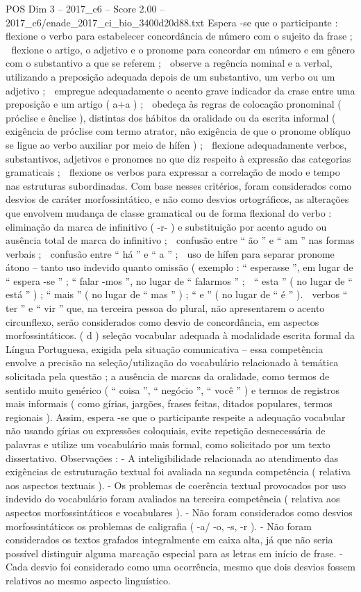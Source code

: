\begin{textsample}{POS Dim 3 – 2017\_c6 – Score 2.00 – 2017\_c6/enade\_2017\_ci\_bio\_3400d20d88.txt}
Espera -se que o participante :  flexione o verbo para estabelecer concordância de número com o sujeito da frase ;  flexione o artigo, o adjetivo e o pronome para concordar em número e em gênero com o substantivo a que se referem ;  observe a regência nominal e a verbal, utilizando a preposição adequada depois de um substantivo, um verbo ou um adjetivo ;  empregue adequadamente o acento grave indicador da crase entre uma preposição e um artigo ( a+a ) ;  obedeça às regras de colocação pronominal ( próclise e ênclise ), distintas dos hábitos da oralidade ou da escrita informal ( exigência de próclise com termo atrator, não exigência de que o pronome oblíquo se ligue ao verbo auxiliar por meio de hífen ) ;  flexione adequadamente verbos, substantivos, adjetivos e pronomes no que diz respeito à expressão das categorias gramaticais ;  flexione os verbos para expressar a correlação de modo e tempo nas estruturas subordinadas.
Com base nesses critérios, foram considerados como desvios de caráter morfossintático, e não como desvios ortográficos, as alterações que envolvem mudança de classe gramatical ou de forma flexional do verbo :  eliminação da marca de infinitivo ( -r- ) e substituição por acento agudo ou ausência total de marca do infinitivo ;  confusão entre “ ão ” e “ am ” nas formas verbais ;  confusão entre “ há ” e “ a ” ;  uso de hífen para separar pronome átono – tanto uso indevido quanto omissão ( exemplo : “ esperasse ”, em lugar de “ espera -se ” ; “ falar -mos ”, no lugar de “ falarmos ” ;  “ esta ” ( no lugar de “ está ” ) ; “ mais ” ( no lugar de “ mas ” ) ; “ e ” ( no lugar de “ é ” ).  verbos “ ter ” e “ vir ” que, na terceira pessoa do plural, não apresentarem o acento circunflexo, serão considerados como desvio de concordância, em aspectos morfossintáticos. ( d ) seleção vocabular adequada à modalidade escrita formal da Língua Portuguesa, exigida pela situação comunicativa – essa competência envolve a precisão na seleção/utilização do vocabulário relacionado à temática solicitada pela questão ; a ausência de marcas da oralidade, como termos de sentido muito genérico ( “ coisa ”, “ negócio ”, “ você ” ) e termos de registros mais informais ( como gírias, jargões, frases feitas, ditados populares, termos regionais ).
Assim, espera -se que o participante respeite a adequação vocabular não usando gírias ou expressões coloquiais, evite repetição desnecessária de palavras e utilize um vocabulário mais formal, como solicitado por um texto dissertativo.
Observações : - A inteligibilidade relacionada ao atendimento das exigências de estruturação textual foi avaliada na segunda competência ( relativa aos aspectos textuais ). - Os problemas de coerência textual provocados por uso indevido do vocabulário foram avaliados na terceira competência ( relativa aos aspectos morfossintáticos e vocabulares ). - Não foram considerados como desvios morfossintáticos os problemas de caligrafia ( -a/ -o, -s, -r ). - Não foram considerados os textos grafados integralmente em caixa alta, já que não seria possível distinguir alguma marcação especial para as letras em início de frase. - Cada desvio foi considerado como uma ocorrência, mesmo que dois desvios fossem relativos ao mesmo aspecto linguístico.

\end{textsample}
